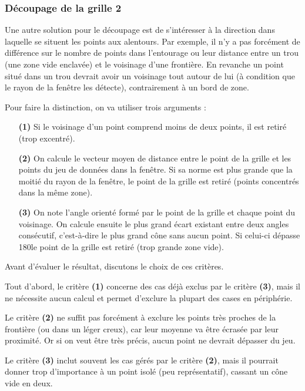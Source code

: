 \documentclass[12pt]{article}
\begin{document}
\newpage
\subsubsection{Découpage de la grille 2}

    Une autre solution pour le découpage est de s'intéresser à la direction dans laquelle se situent les points aux alentours. Par exemple, il n'y a pas forcément de différence sur le nombre de points dans l'entourage ou leur distance entre un trou (une zone vide enclavée) et le voisinage d'une frontière. En revanche un point situé dans un trou devrait avoir un voisinage tout autour de lui (à condition que le rayon de la fenêtre les détecte), contrairement à un bord de zone.

    Pour faire la distinction, on va utiliser trois arguments :
    \begin{enumerate}
        \item[\textbf{(1)}] Si le voisinage d'un point comprend moins de deux points, il est retiré (trop excentré).
        \item[\textbf{(2)}] On calcule le vecteur moyen de distance entre le point de la grille et les points du jeu de données dans la fenêtre. Si sa norme est plus grande que la moitié du rayon de la fenêtre, le point de la grille est retiré (points concentrés dans la même zone).
        \item[\textbf{(3)}] On note l'angle orienté formé par le point de la grille et chaque point du voisinage. On calcule ensuite le plus grand écart existant entre deux angles consécutif, c'est-à-dire le plus grand cône sans aucun point. Si celui-ci dépasse 180\textdegree le point de la grille est retiré (trop grande zone vide).
    \end{enumerate}

    Avant d'évaluer le résultat, discutons le choix de ces critères.

    Tout d'abord, le critère \textbf{(1)} concerne des cas déjà exclus par le critère \textbf{(3)}, mais il ne nécessite aucun calcul et permet d'exclure la plupart des cases en périphérie.

    Le critère \textbf{(2)} ne suffit pas forcément à exclure les points très proches de la frontière (ou dans un léger creux), car leur moyenne va être écrasée par leur proximité. Or si on veut être très précis, aucun point ne devrait dépasser du jeu.

    Le critère \textbf{(3)} inclut souvent les cas gérés par le critère \textbf{(2)}, mais il pourrait donner trop d'importance à un point isolé (peu représentatif), cassant un cône vide en deux.
\end{document}
